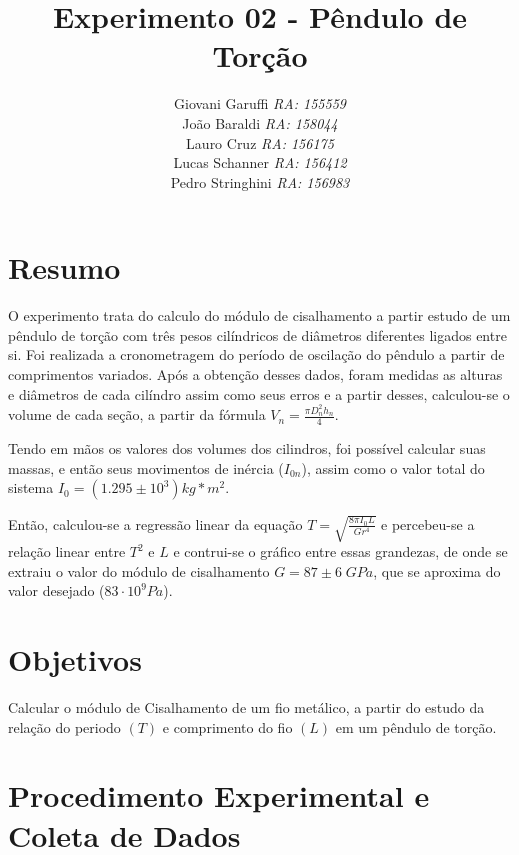 \documentclass[12pt,a4paper]{article}
\begin{document}
\title{\vspace{70mm}\Huge Experimento 02 - Pêndulo de Torção}
\author{ Giovani Garuffi\qquad\hfill
		\textit {RA: 155559}\protect\\
		João Baraldi\hfill
		\textit{RA: 158044}\protect\\
		Lauro Cruz\hfill
		\textit{RA: 156175}\protect\\
		Lucas Schanner\hfill
		\textit{RA: 156412}\protect\\
		Pedro Stringhini\hfill
		\textit {RA: 156983}								
		}
\maketitle
\newpage
\section{Resumo}
O experimento trata do calculo do módulo de cisalhamento a partir estudo de um pêndulo de torção com três pesos cilíndricos de diâmetros diferentes ligados entre si. Foi realizada a cronometragem do período de oscilação do pêndulo a partir de comprimentos variados. Após a obtenção desses dados, foram medidas as alturas e diâmetros de cada cilíndro assim como seus erros e a partir desses, calculou-se o volume de cada seção, a partir da fórmula $V_n = \frac{\pi D_n^2 h_n}{4}$.

Tendo em mãos os valores dos volumes dos cilindros, foi possível calcular suas massas, e então seus movimentos de inércia ($I_{0n}$), assim como o valor total do sistema $I_{0} = (1.295 \pm 10^3)kg*m^2$.

Então, calculou-se a regressão linear da equação $T = \sqrt{\frac{8\pi I_0 L}{G r^4}}$ e percebeu-se a relação linear entre $T^2$ e $L$ e contrui-se o gráfico entre essas grandezas, de onde se extraiu o valor do módulo de cisalhamento $G = 87 \pm 6 \; GPa$, que se aproxima do valor desejado ($83 \cdot 10^9 Pa$).

\section{Objetivos}
Calcular o módulo de Cisalhamento de um fio metálico, a partir do estudo da relação do periodo $(T)$ e comprimento do fio $(L)$ em um pêndulo de torção.


\section{Procedimento Experimental e Coleta de Dados}
\end{document}
